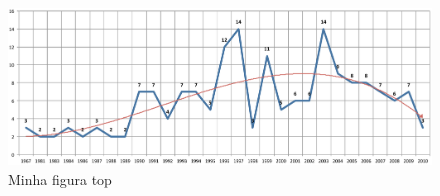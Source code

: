 \documentclass{article}
\begin{document}
  \begin{figure}[h]
    \centering
    \includegraphics[scale=0.5]{abntex2-modelo-img-grafico}
    \caption{Minha figura top}
    \label{fig:top}
  \end{figure}
\end{document}
